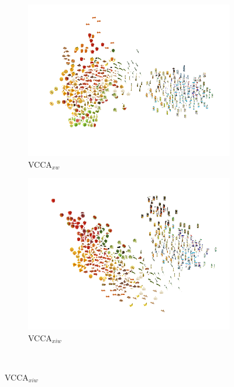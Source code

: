 \begin{figure}[t]
     \begin{subfigure}[b]{0.3\textwidth}
         \centering
         \includegraphics[width=\textwidth]{figures_and_tables/latent_space_visualizations/pca_latents_vcca_xw_seed2.png}
         \caption{VCCA$_{x w}$}
         \label{fig:pca_vcca_xw}
     \end{subfigure} 
     \begin{subfigure}[b]{0.3\textwidth}
         \centering
         \includegraphics[width=\textwidth]{figures_and_tables/latent_space_visualizations/pca_latents_vcca_xiw_seed2.png}
         \caption{VCCA$_{x i w}$}
         \label{fig:pca_vcca_xiw}
     \end{subfigure} \\

\end{figure}
